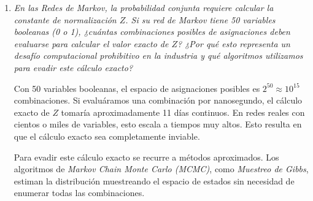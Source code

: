 \documentclass[11pt]{article}
\begin{document}
\begin{enumerate}
\item \textit{En las Redes de Markov, la probabilidad conjunta requiere calcular la constante de 
normalización $Z$. Si su red de Markov tiene 50 variables booleanas (0 o 1), ¿cuántas combinaciones 
posibles de asignaciones deben evaluarse para calcular el valor exacto de $Z$? ¿Por qué esto representa 
un desafío computacional prohibitivo en la industria y qué algoritmos utilizamos para evadir este 
cálculo exacto?}

Con 50 variables booleanas, el espacio de asignaciones posibles es $2^{50} \approx 10^{15}$ 
combinaciones. Si evaluáramos una combinación por nanosegundo, el cálculo exacto de $Z$ 
tomaría aproximadamente 11 días continuos. En redes reales con cientos o miles 
de variables, esto escala a tiempos muy altos. Esto resulta en que el cálculo exacto sea completamente inviable.

Para evadir este cálculo exacto se recurre a métodos aproximados. Los algoritmos de 
\textit{Markov Chain Monte Carlo (MCMC)}, como \textit{Muestreo de Gibbs}, estiman la 
distribución muestreando el espacio de estados sin necesidad de enumerar todas las 
combinaciones.


\end{enumerate}
\end{document}
